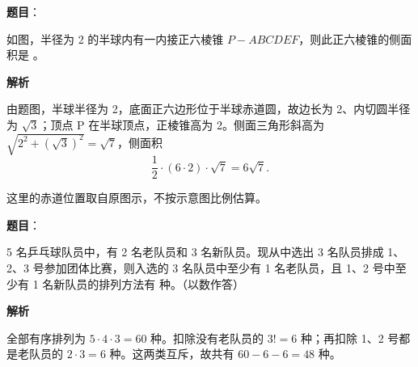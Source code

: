 \begin{answer}

\textbf{题目}：

如图，半径为 2 的半球内有一内接正六棱锥 \(P-ABCDEF\)，则此正六棱锥的侧面积是 \gkblank{}。
\nopagebreak[4]
\begin{center}\end{center}
\nopagebreak[4]
\textbf{解析}

由题图，半球半径为 2，底面正六边形位于半球赤道圆，故边长为 2、内切圆半径为 $\sqrt3$；顶点 P 在半球顶点，正棱锥高为 2。侧面三角形斜高为 $\sqrt{2^2+(\sqrt3)^2}=\sqrt7$，侧面积
\nopagebreak[4]
\[
\frac12\cdot(6\cdot2)\cdot\sqrt7=6\sqrt7.
\]
\nopagebreak[4]
\begin{center}\end{center}
\nopagebreak[4]
这里的赤道位置取自原图示，不按示意图比例估算。


\end{answer}
\begin{answer}

\textbf{题目}：

5 名乒乓球队员中，有 2 名老队员和 3 名新队员。现从中选出 3 名队员排成 1、2、3 号参加团体比赛，则入选的 3 名队员中至少有 1 名老队员，且 1、2 号中至少有 1 名新队员的排列方法有 \gkblank{} 种。（以数作答）

\textbf{解析}

全部有序排列为 $5\cdot4\cdot3=60$ 种。扣除没有老队员的 $3!=6$ 种；再扣除 1、2 号都是老队员的 $2\cdot3=6$ 种。这两类互斥，故共有 $60-6-6=48$ 种。


\end{answer}
